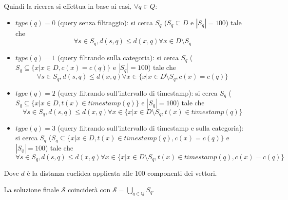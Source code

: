 Quindi la ricerca si effettua in base ai casi, $\forall q\in Q$:
\begin{itemize}
    \item $type(q) = 0$ (query senza filtraggio): si cerca $S_q$ ($S_q \subseteq D$ 
    e $|S_q| = 100$) tale che 
    $$\forall s \in S_q, d(s, q) \le d(x, q) \forall x \in D \setminus S_q$$  
    \item $type(q) = 1$ (query filtrando sulla categoria): si cerca $S_q$ ($S_q \subseteq \{x| x\in D, c(x) = c(q)\}$ 
    e $|S_q| = 100$) tale che 
    $$\forall s \in S_q, d(s, q) \le d(x, q) \forall x \in \{x| x\in D \setminus S_q, c(x) = c(q)\}$$  
    \item $type(q) = 2$ (query filtrando sull'intervallo di timestamp): si cerca 
    $S_q$ ($S_q \subseteq \{x| x\in D, t(x) \in timestamp(q)\}$ 
    e $|S_q| = 100$) tale che 
    $$\forall s \in S_q, d(s, q) \le d(x, q) \forall x \in \{x| x\in D \setminus S_q, t(x) \in timestamp(q)\}$$  
    \item $type(q) = 3$ (query filtrando sull'intervallo di timestamp e sulla categoria): si cerca 
    $S_q$ ($S_q \subseteq \{x| x\in D, t(x) \in timestamp(q),  c(x) = c(q)\}$ 
    e $|S_q| = 100$) tale che 
    $$\forall s \in S_q, d(s, q) \le d(x, q) \forall x \in \{x| x\in D \setminus S_q, t(x) \in timestamp(q), c(x) = c(q)\}$$  
\end{itemize}
Dove $d$ è la distanza euclidea applicata alle $100$ componenti dei vettori.
 
La soluzione finale $\mathcal{S}$ coinciderà con $ \mathcal{S} = \bigcup_{q\in Q} S_q$.

